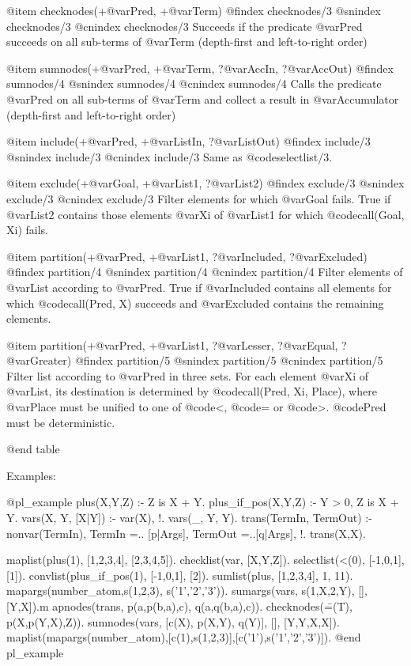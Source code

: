 @item checknodes(+@var{Pred}, +@var{Term}) 
@findex checknodes/3
@snindex checknodes/3
@cnindex checknodes/3
      Succeeds if the predicate @var{Pred} succeeds on all sub-terms of
      @var{Term} (depth-first and left-to-right order)

@item sumnodes(+@var{Pred}, +@var{Term}, ?@var{AccIn}, ?@var{AccOut})
@findex sumnodes/4
@snindex sumnodes/4
@cnindex sumnodes/4
      Calls the predicate @var{Pred} on all sub-terms of @var{Term} and
collect a result in @var{Accumulator} (depth-first and left-to-right
order)

@item include(+@var{Pred}, +@var{ListIn}, ?@var{ListOut})
@findex include/3
@snindex include/3
@cnindex include/3
      Same as @code{selectlist/3}.

@item exclude(+@var{Goal}, +@var{List1}, ?@var{List2})
@findex exclude/3
@snindex exclude/3
@cnindex exclude/3
Filter elements for which @var{Goal} fails. True if @var{List2} contains
      those elements @var{Xi} of @var{List1} for which @code{call(Goal, Xi)} fails.

@item partition(+@var{Pred},  +@var{List1}, ?@var{Included}, ?@var{Excluded})
@findex partition/4
@snindex partition/4
@cnindex partition/4
Filter elements of @var{List} according to @var{Pred}. True if
@var{Included} contains all elements for which @code{call(Pred, X)}
succeeds and @var{Excluded} contains the remaining elements.

@item partition(+@var{Pred},  +@var{List1}, ?@var{Lesser}, ?@var{Equal}, ?@var{Greater})
@findex partition/5
@snindex partition/5
@cnindex partition/5
Filter list according to @var{Pred} in three sets. For each element
@var{Xi} of @var{List}, its destination is determined by
@code{call(Pred, Xi, Place)}, where @var{Place} must be unified to one
of @code{<}, @code{=} or @code{>}. @code{Pred} must be deterministic.

@end table

Examples:

@pl_example
plus(X,Y,Z) :- Z is X + Y.
plus_if_pos(X,Y,Z) :- Y > 0, Z is X + Y.
vars(X, Y, [X|Y]) :- var(X), !.
vars(_, Y, Y).
trans(TermIn, TermOut) :-
  nonvar(TermIn),
  TermIn =.. [p|Args],
  TermOut =..[q|Args], !.
trans(X,X).


maplist(plus(1), [1,2,3,4], [2,3,4,5]).
checklist(var, [X,Y,Z]).
selectlist(<(0), [-1,0,1], [1]).
convlist(plus_if_pos(1), [-1,0,1], [2]).
sumlist(plus, [1,2,3,4], 1, 11).
mapargs(number_atom,s(1,2,3), s('1','2','3')).
sumargs(vars, s(1,X,2,Y), [], [Y,X]).m
apnodes(trans, p(a,p(b,a),c), q(a,q(b,a),c)).
checknodes(\==(T), p(X,p(Y,X),Z)).
sumnodes(vars, [c(X), p(X,Y), q(Y)], [], [Y,Y,X,X]).
maplist(mapargs(number_atom),[c(1),s(1,2,3)],[c('1'),s('1','2','3')]).
@end pl_example

